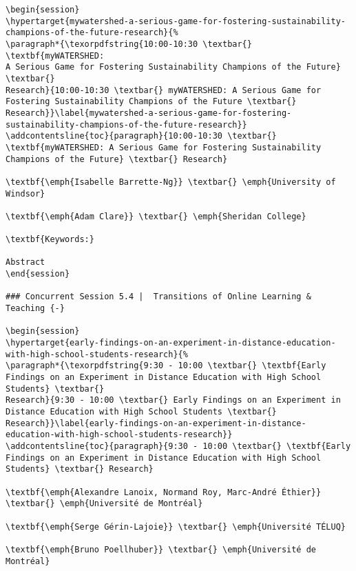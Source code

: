 \documentclass[
]{book}
\begin{document}
\begin{verbatim}
\begin{session}
\hypertarget{mywatershed-a-serious-game-for-fostering-sustainability-champions-of-the-future-research}{%
\paragraph*{\texorpdfstring{10:00-10:30 \textbar{} \textbf{myWATERSHED:
A Serious Game for Fostering Sustainability Champions of the Future}
\textbar{}
Research}{10:00-10:30 \textbar{} myWATERSHED: A Serious Game for Fostering Sustainability Champions of the Future \textbar{} Research}}\label{mywatershed-a-serious-game-for-fostering-sustainability-champions-of-the-future-research}}
\addcontentsline{toc}{paragraph}{10:00-10:30 \textbar{}
\textbf{myWATERSHED: A Serious Game for Fostering Sustainability
Champions of the Future} \textbar{} Research}

\textbf{\emph{Isabelle Barrette-Ng}} \textbar{} \emph{University of
Windsor}

\textbf{\emph{Adam Clare}} \textbar{} \emph{Sheridan College}

\textbf{Keywords:}

Abstract
\end{session}

### Concurrent Session 5.4 |  Transitions of Online Learning & Teaching {-}

\begin{session}
\hypertarget{early-findings-on-an-experiment-in-distance-education-with-high-school-students-research}{%
\paragraph*{\texorpdfstring{9:30 - 10:00 \textbar{} \textbf{Early
Findings on an Experiment in Distance Education with High School
Students} \textbar{}
Research}{9:30 - 10:00 \textbar{} Early Findings on an Experiment in Distance Education with High School Students \textbar{} Research}}\label{early-findings-on-an-experiment-in-distance-education-with-high-school-students-research}}
\addcontentsline{toc}{paragraph}{9:30 - 10:00 \textbar{} \textbf{Early
Findings on an Experiment in Distance Education with High School
Students} \textbar{} Research}

\textbf{\emph{Alexandre Lanoix, Normand Roy, Marc-André Éthier}}
\textbar{} \emph{Université de Montréal}

\textbf{\emph{Serge Gérin-Lajoie}} \textbar{} \emph{Université TÉLUQ}

\textbf{\emph{Bruno Poellhuber}} \textbar{} \emph{Université de
Montréal}


\end{verbatim}
\end{document}
